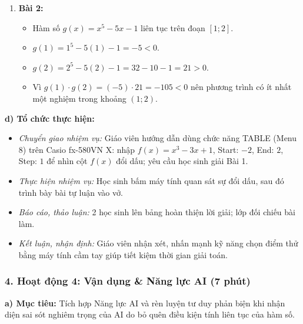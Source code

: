 \documentclass[12pt, a4paper]{article}
\begin{document}
\begin{enumerate}[leftmargin=0.6cm]
\begin{itemize}
        \item Mặt khác, phương trình bậc ba có tối đa 3 nghiệm thực, do đó phương trình có đúng 3 nghiệm thực phân biệt trong khoảng $(-2; 2)$.
    \end{itemize}
    \item \textbf{Bài 2:}
    \begin{itemize}
        \item Hàm số $g(x) = x^5 - 5x - 1$ liên tục trên đoạn $[1; 2]$.
        \item $g(1) = 1^5 - 5(1) - 1 = -5 < 0$.
        \item $g(2) = 2^5 - 5(2) - 1 = 32 - 10 - 1 = 21 > 0$.
        \item Vì $g(1) \cdot g(2) = (-5) \cdot 21 = -105 < 0$ nên phương trình có ít nhất một nghiệm trong khoảng $(1; 2)$.
    \end{itemize}
\end{enumerate}

\noindent \textbf{d) Tổ chức thực hiện:}
\begin{itemize}[leftmargin=0.8cm]
    \item \textit{Chuyển giao nhiệm vụ:} Giáo viên hướng dẫn dùng chức năng TABLE (Menu 8) trên Casio fx-580VN X: nhập $f(x) = x^3 - 3x + 1$, Start: $-2$, End: $2$, Step: $1$ để nhìn cột $f(x)$ đổi dấu; yêu cầu học sinh giải Bài 1.
    \item \textit{Thực hiện nhiệm vụ:} Học sinh bấm máy tính quan sát sự đổi dấu, sau đó trình bày bài tự luận vào vở.
    \item \textit{Báo cáo, thảo luận:} 2 học sinh lên bảng hoàn thiện lời giải; lớp đối chiếu bài làm.
    \item \textit{Kết luận, nhận định:} Giáo viên nhận xét, nhấn mạnh kỹ năng chọn điểm thử bằng máy tính cầm tay giúp tiết kiệm thời gian giải toán.
\end{itemize}

\subsubsection*{4. Hoạt động 4: Vận dụng \& Năng lực AI (7 phút)}

\noindent \textbf{a) Mục tiêu:}
Tích hợp Năng lực AI và rèn luyện tư duy phản biện khi nhận diện sai sót nghiêm trọng của AI do bỏ quên điều kiện tính liên tục của hàm số.
\end{document}
